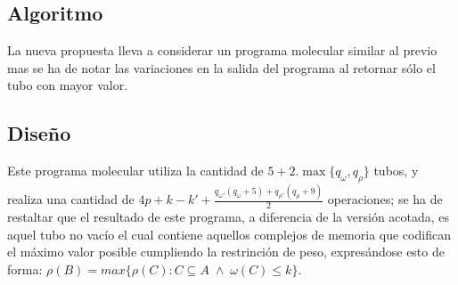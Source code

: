 \documentclass[12pt, letterpaper, twoside]{article}
\begin{document}
    \subsection{Algoritmo}
    La nueva propuesta lleva a considerar un programa molecular similar al previo mas se ha de notar las variaciones en la salida del programa al retornar sólo el tubo con mayor valor.
    \begin{algorithm}
        \begin{algorithmic}[1]
            \EndFor
                \Else
                \EndIf
            \EndWhile
            \EndProcedure
        \end{algorithmic}
    \end{algorithm}
    \subsection{Diseño}
    Este programa molecular utiliza la cantidad de $5+2.\max{\{q_\omega,q_\rho\}}$ tubos, y realiza una cantidad de $4p+k-k'+\frac{q_\omega.(q_\omega+5)+q_\rho.(q_\rho+9)}{2}$ operaciones; se ha de restaltar que el resultado de este programa, a diferencia de la versión acotada, es aquel tubo no vacío el cual contiene aquellos complejos de memoria que codifican el máximo valor posible cumpliendo la restrinción de peso, expresándose esto de forma: $\rho(B) = max\{\rho(C):C\subseteq A\;\land\;\omega(C) \leq k\}$.

    \newpage
\end{document}
